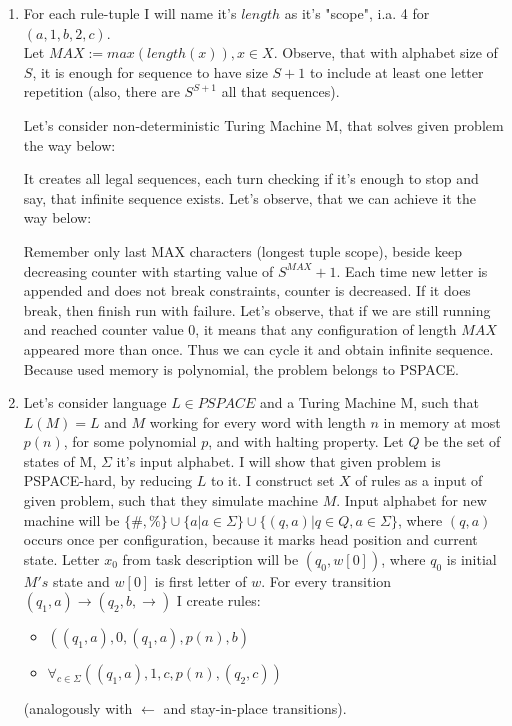 \documentclass[12pt]{article}
\begin{document}
\begin{enumerate}
\item For each rule-tuple I will name it's $length$ as it's "scope", i.a. 4 for $(a,1,b,2,c)$.\\  Let $MAX := max(length(x)), x \in X$.
Observe, that with alphabet size of $S$, it is enough for sequence to have size $S+1$ to include at least one letter repetition (also, there are $S^{S+1}$ all that sequences).


Let's consider non-deterministic Turing Machine M, that solves given problem the way below: 

It creates all legal sequences, each turn checking if it's enough to stop and say, that infinite sequence exists. Let's observe, that we can achieve it the way below:

Remember only last MAX characters (longest tuple scope), beside keep decreasing counter with starting value of $S^{MAX} + 1$. Each time new letter is appended and does not break constraints, counter is decreased. If it does break, then finish run with failure. Let's observe, that if we are still running and reached counter value 0, it means that any configuration of length $MAX$ appeared more than once. Thus we can cycle it and obtain infinite sequence. Because used memory is polynomial, the problem belongs to PSPACE.


\item Let's consider language $L \in PSPACE$ and a Turing Machine M, such that $L(M) = L$ and $M$ working for every word with length $n$ in memory at most $p(n)$, for some polynomial $p$, and with halting property. Let $Q$ be the set of states of M, $\Sigma$ it's input alphabet.
I will show that given problem is PSPACE-hard, by reducing $L$ to it.
I construct set $X$ of rules as a input of given problem, such that they simulate machine $M$. 
Input alphabet for new machine will be $ \{\#, \%\} \cup  \{a \rvert a \in \Sigma \} \cup \{(q,a) \rvert q \in Q, a \in \Sigma \} $, where $(q,a)$ occurs once per configuration, because it marks head position and current state. Letter $x_0$ from task description will be $(q_0, w[0])$, where $q_0$ is initial $M's$ state and $w[0]$ is first letter of $w$. For every transition $(q_1, a) \rightarrow (q_2, b, \rightarrow)$ I create rules:\\
\begin{itemize}
    \item $((q_1,a), 0, (q_1,a), p(n), b)$
    \item $\forall_{c \in \Sigma} ((q_1,a), 1, c, p(n), (q_2, c))$
\end{itemize}
(analogously with $\leftarrow$ and stay-in-place transitions). \\ 


\end{enumerate}
\end{document}
